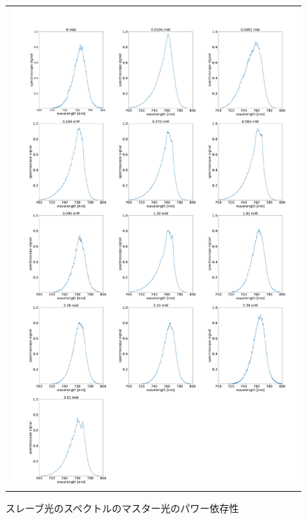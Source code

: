 \documentclass[uplatex, dvipdfmx, a4paper, report, papersize, 11pt]{jsbook}
\begin{document}
\newpage
\begin{figure}[H]
  \centering
    \begin{tabular}{c}
      \begin{minipage}{1\hsize}
        \centering
          \includegraphics[keepaspectratio,  scale=0.15,  angle=0]
                          {figures/chapter4/766_slave-input-power.png}
                          \caption{スレーブ光のスペクトルのマスター光のパワー依存性}
                          \label{766_slave-input-power}
      \end{minipage}
  \end{tabular}
\end{figure}
\end{document}
